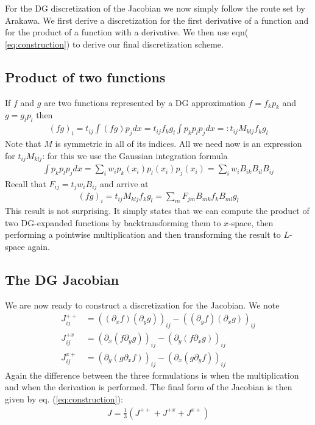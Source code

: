 \documentclass[a4paper,12pt]{scrartcl}
\begin{document}
For the DG discretization of the Jacobian we now simply follow the route set by
Arakawa. We first derive a discretization for the first derivative of a function
and for the product of a function with a derivative. We then use eqn( \ref{eq:construction}) to derive our final discretization scheme. 







\subsection{ Product of two functions }
If $f$ and $g$ are two functions represented by a DG approximation $f = f_kp_k$ and
$g = g_lp_l$ then 
\begin{align}
    (fg)_i = t_{ij}\int (fg)p_j dx = t_{ij} f_k g_l \int p_k p_l p_j dx =: t_{ij} M_{klj} f_k g_l
    \label{}
\end{align}
Note that $M$ is symmetric in all of its indices. All we need now is an expression for
$t_{ij}M_{klj}$: for this we use the Gaussian integration formula
\begin{align}
    \int p_k p_l p_j dx = \sum_i w_i p_k(x_i)p_l(x_i)p_j(x_i) = \sum_i w_i B_{ik}B_{il}B_{ij}
    \label{}
\end{align}
Recall that $F_{ij} = t_j w_i B_{ij}$ and arrive at
\begin{align}
    (fg)_i = t_{ij} M_{klj} f_k g_l = \sum_m F_{jm} B_{mk}f_k B_{ml}g_l
    \label{}
\end{align}
This result is not surprising. It simply states that we can compute the product
of two DG-expanded functions by backtransforming them to $x$-space, then performing
a pointwise multiplication and then transforming the result to $L$-space again.











\subsection{ The DG Jacobian}
We are now ready to construct a discretization for the Jacobian. 
We note 
\begin{subequations}
    \begin{align}
        J^{++}_{ij} &= ((\partial_x f)(\partial_y g))_{ij} - ((\partial_y f)(\partial_x g))_{ij} \\
        J^{+x}_{ij} &= (\partial_x ( f\partial_y g))_{ij} - (\partial_y (f\partial_x g))_{ij} \\
        J^{x+}_{ij} &= (\partial_y (g\partial_x f))_{ij} - (\partial_x( g\partial_y f))_{ij}
        \label{}
    \end{align}
    \label{}
\end{subequations}
Again the difference between the three formulations is when the multiplication
and when the derivation is performed. 
The final form of the Jacobian is then given by eq. (\ref{eq:construction}):
\begin{align}
    J = \frac{1}{3}(J^{++} + J^{+x} + J^{x+})
    \label{}
\end{align}
\end{document}
